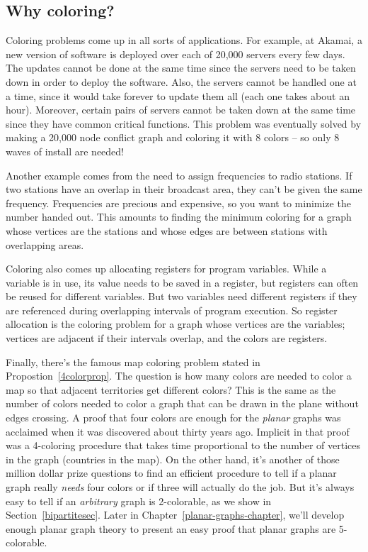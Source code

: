\subsection{Why coloring?}

Coloring problems come up in all sorts of applications.  For example, at
Akamai, a new version of software is deployed over each of 20,000 servers
every few days.  The updates cannot be done at the same time since the
servers need to be taken down in order to deploy the software.  Also, the
servers cannot be handled one at a time, since it would take forever to
update them all (each one takes about an hour).  Moreover, certain pairs
of servers cannot be taken down at the same time since they have common
critical functions.  This problem was eventually solved by making a 20,000
node conflict graph and coloring it with 8 colors -- so only 8 waves of
install are needed!

Another example comes from the need to assign frequencies to radio
stations.  If two stations have an overlap in their broadcast area, they
can't be given the same frequency.  Frequencies are precious and
expensive, so you want to minimize the number handed out.  This amounts to
finding the minimum coloring for a graph whose vertices are the stations
and whose edges are between stations with overlapping areas.

Coloring also comes up allocating registers for program variables.  While
a variable is in use, its value needs to be saved in a register, but
registers can often be reused for different variables.  But two variables
need different registers if they are referenced during overlapping
intervals of program execution.  So register allocation is the coloring
problem for a graph whose vertices are the variables; vertices are
adjacent if their intervals overlap, and the colors are registers.

Finally, there's the famous map coloring problem stated in
Propostion~\ref{4colorprop}.  The question is how many colors are needed
to color a map so that adjacent territories get different colors?  This is
the same as the number of colors needed to color a graph that can be drawn
in the plane without edges crossing.  A proof that four colors are enough
for the \emph{planar} graphs was acclaimed when it was discovered about
thirty years ago.  Implicit in that proof was a 4-coloring procedure that
takes time proportional to the number of vertices in the graph (countries
in the map).  On the other hand, it's another of those million dollar
prize questions to find an efficient procedure to tell if a planar graph
really \emph{needs} four colors or if three will actually do the job.  But
it's always easy to tell if an \emph{arbitrary} graph is 2-colorable, as
we show in Section~\ref{bipartitesec}.  Later in
Chapter~\ref{planar-graphs-chapter}, we'll develop enough planar graph
theory to present an easy proof that planar graphs are 5-colorable.

